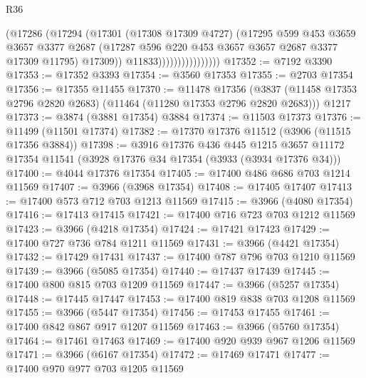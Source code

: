 \begin{lexlean}{R36}
\begin{coremodule}
                                (@17286
                                  (@17294
                                    (@17301
                                      (@17308 @17309 @4727)
                                      (@17295
                                        @599
                                        @453
                                        @3659
                                        @3657
                                        @3377
                                        @2687
                                        (@17287
                                          @596
                                          @220
                                          @453
                                          @3657
                                          @3657
                                          @2687
                                          @3377
                                          @17309
                                          @11795)
                                        @17309))
                                    @11833))))))))))))))))
@17352 := @7192 @3390
@17353 := @17352 @3393
@17354 := @3560 @17353
@17355 := @2703 @17354
@17356 := @17355 @11455
@17370 := @11478
    @17356
    (@3837 (@11458 @17353 @2796 @2820 @2683) (@11464 (@11280 @17353 @2796 @2820 @2683)))
    @1217
@17373 := @3874 (@3881 @17354) @3884
@17374 := @11503 @17373
@17376 := @11499 (@11501 @17374)
@17382 := @17370 @17376 @11512 (@3906 (@11515 @17356 @3884))
@17398 := @3916
    @17376
    @436
    @445
    @1215
    @3657
    @11172
    @17354
    @11541
    (@3928 @17376 @34 @17354 (@3933 (@3934 @17376 @34)))
@17400 := @4044 @17376 @17354
@17405 := @17400 @486 @686 @703 @1214 @11569
@17407 := @3966 (@3968 @17354)
@17408 := @17405 @17407
@17413 := @17400 @573 @712 @703 @1213 @11569
@17415 := @3966 (@4080 @17354)
@17416 := @17413 @17415
@17421 := @17400 @716 @723 @703 @1212 @11569
@17423 := @3966 (@4218 @17354)
@17424 := @17421 @17423
@17429 := @17400 @727 @736 @784 @1211 @11569
@17431 := @3966 (@4421 @17354)
@17432 := @17429 @17431
@17437 := @17400 @787 @796 @703 @1210 @11569
@17439 := @3966 (@5085 @17354)
@17440 := @17437 @17439
@17445 := @17400 @800 @815 @703 @1209 @11569
@17447 := @3966 (@5257 @17354)
@17448 := @17445 @17447
@17453 := @17400 @819 @838 @703 @1208 @11569
@17455 := @3966 (@5447 @17354)
@17456 := @17453 @17455
@17461 := @17400 @842 @867 @917 @1207 @11569
@17463 := @3966 (@5760 @17354)
@17464 := @17461 @17463
@17469 := @17400 @920 @939 @967 @1206 @11569
@17471 := @3966 (@6167 @17354)
@17472 := @17469 @17471
@17477 := @17400 @970 @977 @703 @1205 @11569

\end{coremodule}
\end{lexlean}
